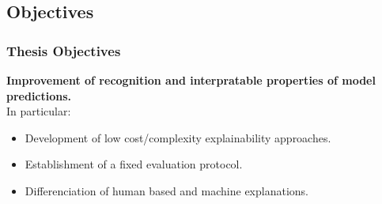 \subsection*{Objectives}
\begin{frame}[t]
    \frametitle{Thesis Objectives}
    \textbf{Improvement of recognition and interpratable properties of model predictions.}\\
    \vspace{20pt}
    \pause    
    In particular:
    \begin{itemize}
        \item Development of low cost/complexity explainability approaches.\pause
        \item Establishment of a fixed evaluation protocol. \pause
        \item Differenciation of human based and machine explanations.
    \end{itemize}

\end{frame}